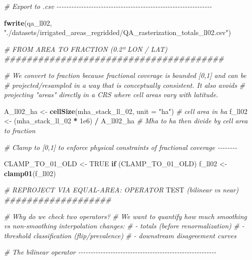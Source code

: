\documentclass[
  11pt,
]{article}
\newenvironment{Shaded}{\begin{snugshade}}{\end{snugshade}}
\newcommand{\AlertTok}[1]{\textcolor[rgb]{0.94,0.16,0.16}{#1}}
\newcommand{\AttributeTok}[1]{\textcolor[rgb]{0.13,0.29,0.53}{#1}}
\newcommand{\CommentTok}[1]{\textcolor[rgb]{0.56,0.35,0.01}{\textit{#1}}}
\newcommand{\ConstantTok}[1]{\textcolor[rgb]{0.56,0.35,0.01}{#1}}
\newcommand{\ControlFlowTok}[1]{\textcolor[rgb]{0.13,0.29,0.53}{\textbf{#1}}}
\newcommand{\FloatTok}[1]{\textcolor[rgb]{0.00,0.00,0.81}{#1}}
\newcommand{\FunctionTok}[1]{\textcolor[rgb]{0.13,0.29,0.53}{\textbf{#1}}}
\newcommand{\NormalTok}[1]{#1}
\newcommand{\OtherTok}[1]{\textcolor[rgb]{0.56,0.35,0.01}{#1}}
\newcommand{\SpecialCharTok}[1]{\textcolor[rgb]{0.81,0.36,0.00}{\textbf{#1}}}
\newcommand{\StringTok}[1]{\textcolor[rgb]{0.31,0.60,0.02}{#1}}
\begin{document}
\begin{Shaded}
\begin{Highlighting}[]
\CommentTok{\# Export to .csv {-}{-}{-}{-}{-}{-}{-}{-}{-}{-}{-}{-}{-}{-}{-}{-}{-}{-}{-}{-}{-}{-}{-}{-}{-}{-}{-}{-}{-}{-}{-}{-}{-}{-}{-}{-}{-}{-}{-}{-}{-}{-}{-}{-}{-}{-}{-}{-}{-}{-}{-}{-}{-}{-}{-}{-}{-}{-}{-}{-}{-}{-}{-}}

\FunctionTok{fwrite}\NormalTok{(qa\_ll02, }\StringTok{"./datasets/irrigated\_areas\_regridded/QA\_rasterization\_totals\_ll02.csv"}\NormalTok{)}

\CommentTok{\# FROM AREA TO FRACTION (0.2º LON / LAT) \#\#\#\#\#\#\#\#\#\#\#\#\#\#\#\#\#\#\#\#\#\#\#\#\#\#\#\#\#\#\#\#\#\#\#\#\#\#\#}

\CommentTok{\# We convert to fraction because fractional coverage is bounded [0,1] and can be}
\CommentTok{\# projected/resampled in a way that is conceptually consistent. It also avoids }
\CommentTok{\# projecting "areas" directly in a CRS where cell areas vary with latitude.}

\NormalTok{A\_ll02\_ha }\OtherTok{\textless{}{-}} \FunctionTok{cellSize}\NormalTok{(mha\_stack\_ll\_02, }\AttributeTok{unit =} \StringTok{"ha"}\NormalTok{) }\CommentTok{\# cell area in ha}
\NormalTok{f\_ll02 }\OtherTok{\textless{}{-}}\NormalTok{ (mha\_stack\_ll\_02 }\SpecialCharTok{*} \FloatTok{1e6}\NormalTok{) }\SpecialCharTok{/}\NormalTok{ A\_ll02\_ha }\CommentTok{\# Mha to ha then divide by cell area to fraction}

\CommentTok{\# Clamp to [0,1] to enforce physical constraints of fractional coverage {-}{-}{-}{-}{-}{-}{-}{-}}

\NormalTok{CLAMP\_TO\_01\_OLD }\OtherTok{\textless{}{-}} \ConstantTok{TRUE}
\ControlFlowTok{if}\NormalTok{ (CLAMP\_TO\_01\_OLD) f\_ll02 }\OtherTok{\textless{}{-}} \FunctionTok{clamp01}\NormalTok{(f\_ll02)}


\CommentTok{\# REPROJECT VIA EQUAL{-}AREA: OPERATOR }\AlertTok{TEST}\CommentTok{ (bilinear vs near) \#\#\#\#\#\#\#\#\#\#\#\#\#\#\#\#\#\#\#}

\CommentTok{\# Why do we check two operators?}
\CommentTok{\#   We want to quantify how much smoothing vs non{-}smoothing interpolation changes:}
\CommentTok{\#   {-} totals (before renormalization)}
\CommentTok{\#   {-} threshold classification (flip/prevalence)}
\CommentTok{\#   {-} downstream disagreement curves}

\CommentTok{\# The bilinear operator {-}{-}{-}{-}{-}{-}{-}{-}{-}{-}{-}{-}{-}{-}{-}{-}{-}{-}{-}{-}{-}{-}{-}{-}{-}{-}{-}{-}{-}{-}{-}{-}{-}{-}{-}{-}{-}{-}{-}{-}{-}{-}{-}{-}{-}{-}{-}{-}{-}{-}{-}{-}{-}{-}{-}{-}}


\end{Highlighting}
\end{Shaded}
\end{document}
